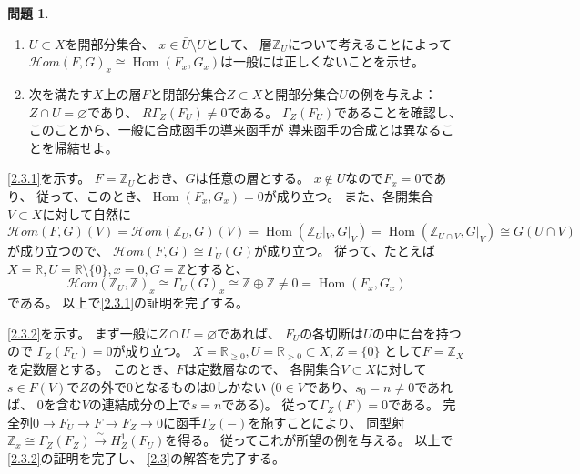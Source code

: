 \documentclass[uplatex,dvipdfmx]{jsarticle}
\makeatletter
\theoremstyle{definition}
\newtheorem{prob}[prob]{問題}
\renewenvironment{proof}[1][\proofname]{
  \pushQED{\qed}%
  \normalfont \topsep6\p@\@plus6\p@\relax
  \trivlist
  \item[\hskip\labelsep
    #1\@addpunct{\textbf{.}}]\ignorespaces
}{%
  \popQED\endtrivlist\@endpefalse
}
\providecommand{\proofname}{証明}
\DeclareMathOperator{\Hom}{\mathrm{Hom}}
\newcommand{\inHom}{\mathcal{H}om}
\newcommand\R{\mathbb{R}}
\newcommand\Z{\mathbb{Z}}
\renewcommand{\emptyset}{\varnothing}
\makeatother
\begin{document}
\begin{prob}\label{2.3}
  \begin{enumerate}
    \item \label{2.3.1}
    \(U\subset X\)を開部分集合、
    \(x\in\bar{U}\setminus U\)として、
    層\(\Z_U\)について考えることによって
    \(\inHom(F,G)_x\cong \Hom(F_x,G_x)\)は一般には正しくないことを示せ。
    \item \label{2.3.2}
    次を満たす\(X\)上の層\(F\)と閉部分集合\(Z\subset X\)と開部分集合\(U\)の例を与えよ：
    \(Z\cap U=\emptyset\)であり、
    \(R\Gamma_Z(F_U)\neq 0\)である。
    \(\Gamma_Z(F_U)\)であることを確認し、
    このことから、一般に合成函手の導来函手が
    導来函手の合成とは異なることを帰結せよ。
  \end{enumerate}
\end{prob}

\begin{proof}
  \ref{2.3.1}を示す。
  \(F=\Z_U\)とおき、\(G\)は任意の層とする。
  \(x\not\in U\)なので\(F_x=0\)であり、
  従って、このとき、\(\Hom(F_x,G_x)=0\)が成り立つ。
  また、各開集合\(V\subset X\)に対して自然に
  \[
  \inHom(F,G)(V) = \inHom(\Z_U,G)(V) = \Hom(\Z_U|_V,G|_V)
  = \Hom(\Z_{U\cap V},G|_V) \cong G(U\cap V)
  \]
  が成り立つので、
  \(\inHom(F,G)\cong \Gamma_U(G)\)が成り立つ。
  従って、たとえば\(X=\R,U=\R\setminus \{0\},x=0,G=\Z\)とすると、
  \[
  \inHom(\Z_U,\Z)_x \cong \Gamma_U(G)_x
  \cong \Z\oplus\Z \neq 0 = \Hom(F_x,G_x)
  \]
  である。
  以上で\ref{2.3.1}の証明を完了する。

  \ref{2.3.2}を示す。
  まず一般に\(Z\cap U=\emptyset\)であれば、
  \(F_U\)の各切断は\(U\)の中に台を持つので
  \(\Gamma_Z(F_U)=0\)が成り立つ。
  \(X=\R_{\geq 0}, U=\R_{>0}\subset X, Z=\{0\}\)
  として\(F=\Z_X\)を定数層とする。
  このとき、\(F\)は定数層なので、
  各開集合\(V\subset X\)に対して
  \(s\in F(V)\)で\(Z\)の外で\(0\)となるものは\(0\)しかない
  (\(0\in V\)であり、\(s_0=n\neq 0\)であれば、
  \(0\)を含む\(V\)の連結成分の上で\(s=n\)である)。
  従って\(\Gamma_Z(F)=0\)である。
  完全列\(0\to F_U\to F\to F_Z\to 0\)に函手\(\Gamma_Z(-)\)を施すことにより、
  同型射
  \(\Z_x \cong \Gamma_Z(F_Z)\xrightarrow{\sim} H^1_Z(F_U)\)を得る。
  従ってこれが所望の例を与える。
  以上で\ref{2.3.2}の証明を完了し、
  \autoref{2.3}の解答を完了する。
\end{proof}
\end{document}
